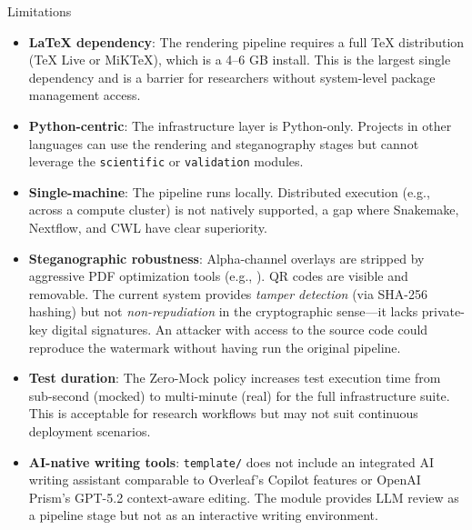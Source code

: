 \documentclass[
  ignorenonframetext,
]{beamer}
\providecommand{\tightlist}{%
  \setlength{\itemsep}{0pt}\setlength{\parskip}{0pt}}
\begin{document}
\begin{frame}{Limitations}
\protect{}\label{limitations}
\begin{itemize}
\tightlist
\item
  \textbf{LaTeX dependency}: The rendering pipeline requires a full TeX
  distribution (TeX Live or MiKTeX), which is a 4--6 GB install. This is
  the largest single dependency and is a barrier for researchers without
  system-level package management access.
\item
  \textbf{Python-centric}: The infrastructure layer is Python-only.
  Projects in other languages can use the rendering and steganography
  stages but cannot leverage the \texttt{scientific} or
  \texttt{validation} modules.
\item
  \textbf{Single-machine}: The pipeline runs locally. Distributed
  execution (e.g., across a compute cluster) is not natively supported,
  a gap where Snakemake, Nextflow, and CWL have clear superiority.
\item
  \textbf{Steganographic robustness}: Alpha-channel overlays are
  stripped by aggressive PDF optimization tools (e.g.,
  ). QR codes are visible and removable. The
  current system provides \emph{tamper detection} (via SHA-256 hashing)
  but not \emph{non-repudiation} in the cryptographic sense---it lacks
  private-key digital signatures. An attacker with access to the source
  code could reproduce the watermark without having run the original
  pipeline.
\item
  \textbf{Test duration}: The Zero-Mock policy increases test execution
  time from sub-second (mocked) to multi-minute (real) for the full
  infrastructure suite. This is acceptable for research workflows but
  may not suit continuous deployment scenarios.
\item
  \textbf{AI-native writing tools}: \texttt{template/} does not include
  an integrated AI writing assistant comparable to Overleaf's Copilot
  features or OpenAI Prism's GPT-5.2 context-aware editing. The
   module provides LLM review as a pipeline
  stage but not as an interactive writing environment.
\end{itemize}
\end{frame}
\end{document}
